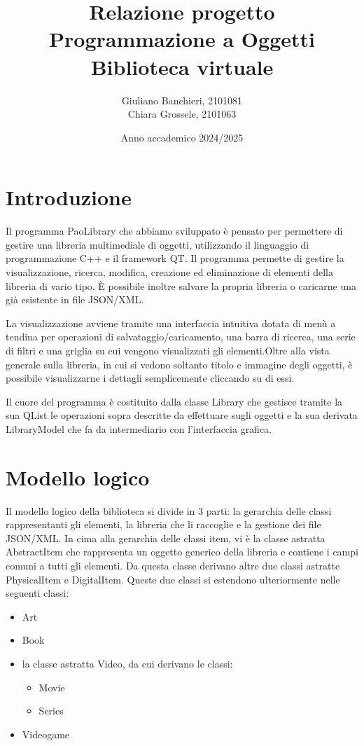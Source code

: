 \documentclass[a4paper,10pt]{article}
\title{Relazione progetto\\ Programmazione a Oggetti\\  Biblioteca virtuale}
\author{Giuliano Banchieri, 2101081 \\ Chiara Grossele, 2101063}
\date{Anno accademico 2024/2025}
\begin{document}
\maketitle
\tableofcontents
\newpage


\section{Introduzione}

Il programma PaoLibrary che abbiamo sviluppato è pensato per permettere di gestire una libreria multimediale di oggetti, utilizzando il linguaggio di programmazione C++ e il framework QT. Il programma permette di gestire la visualizzazione, ricerca, modifica, creazione ed eliminazione di elementi della libreria di vario tipo. È possibile inoltre salvare la propria libreria o caricarne una già esistente in file JSON/XML.

La visualizzazione avviene tramite una interfaccia intuitiva dotata di menù a tendina per operazioni di salvataggio/caricamento, una barra di ricerca, una serie di filtri e una griglia su cui vengono visualizzati gli elementi.Oltre alla vista generale sulla libreria, in cui si vedono soltanto titolo e immagine degli oggetti, è possibile visualizzarne i dettagli semplicemente cliccando su di essi.

Il cuore del programma è costituito dalla classe Library che gestisce tramite la sua QList le operazioni sopra descritte da effettuare sugli oggetti  e la sua derivata LibraryModel che fa da intermediario con l'interfaccia grafica.

\section{Modello logico}
Il modello logico della biblioteca si divide in 3 parti: la gerarchia delle classi rappresentanti gli elementi, la libreria che li raccoglie e la gestione dei file JSON/XML.
In cima alla gerarchia delle classi item, vi è la classe astratta AbstractItem che rappresenta un oggetto generico della libreria e contiene i campi comuni a tutti gli elementi. Da questa classe derivano altre due classi astratte PhysicalItem e DigitalItem. Queste due classi si estendono ulteriormente nelle seguenti classi:
\begin{itemize}
    \item Art
    \item Book
    \item la classe astratta Video, da cui derivano le classi:
        \begin{itemize}
            \item Movie
            \item Series
        \end{itemize}
    \item Videogame
\end{itemize}
\end{document}
